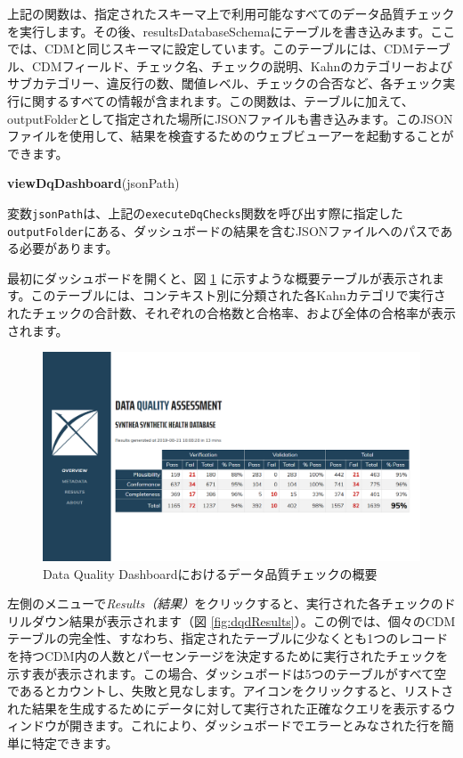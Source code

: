 \documentclass[
  11pt]{book}
\newenvironment{Shaded}{\begin{snugshade}}{\end{snugshade}}
\newcommand{\FunctionTok}[1]{\textcolor[rgb]{0.13,0.29,0.53}{\textbf{#1}}}
\newcommand{\NormalTok}[1]{#1}
\theoremstyle{definition}
\theoremstyle{definition}
\theoremstyle{definition}
\theoremstyle{definition}
\theoremstyle{remark}
\begin{document}
上記の関数は、指定されたスキーマ上で利用可能なすべてのデータ品質チェックを実行します。その後、resultsDatabaseSchemaにテーブルを書き込みます。ここでは、CDMと同じスキーマに設定しています。このテーブルには、CDMテーブル、CDMフィールド、チェック名、チェックの説明、Kahnのカテゴリーおよびサブカテゴリー、違反行の数、閾値レベル、チェックの合否など、各チェック実行に関するすべての情報が含まれます。この関数は、テーブルに加えて、outputFolderとして指定された場所にJSONファイルも書き込みます。このJSONファイルを使用して、結果を検査するためのウェブビューアーを起動することができます。

\begin{Shaded}
\begin{Highlighting}[]
\FunctionTok{viewDqDashboard}\NormalTok{(jsonPath)}
\end{Highlighting}
\end{Shaded}

変数\texttt{jsonPath}は、上記の\texttt{executeDqChecks}関数を呼び出す際に指定した\texttt{outputFolder}にある、ダッシュボードの結果を含むJSONファイルへのパスである必要があります。

最初にダッシュボードを開くと、図 \ref{fig:dqdOverview} に示すような概要テーブルが表示されます。このテーブルには、コンテキスト別に分類された各Kahnカテゴリで実行されたチェックの合計数、それぞれの合格数と合格率、および全体の合格率が表示されます。

\begin{figure}

{\centering \includegraphics[width=1\linewidth]{images/DataQuality/dqdOverview} 

}

\caption{Data Quality Dashboardにおけるデータ品質チェックの概要}\label{fig:dqdOverview}
\end{figure}

左側のメニューで\emph{Results（結果）}をクリックすると、実行された各チェックのドリルダウン結果が表示されます（図 \ref{fig:dqdResults}）。この例では、個々のCDMテーブルの完全性、すなわち、指定されたテーブルに少なくとも1つのレコードを持つCDM内の人数とパーセンテージを決定するために実行されたチェックを示す表が表示されます。この場合、ダッシュボードは5つのテーブルがすべて空であるとカウントし、失敗と見なします。アイコンをクリックすると、リストされた結果を生成するためにデータに対して実行された正確なクエリを表示するウィンドウが開きます。これにより、ダッシュボードでエラーとみなされた行を簡単に特定できます。
\end{document}
